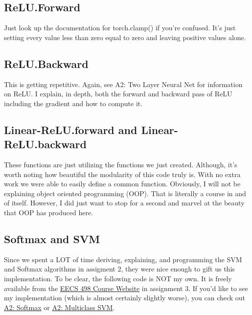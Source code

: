 \documentclass[12pt]{article}
\begin{document}
\subsection{ReLU.Forward}
Just look up the documentation for torch.clamp() if you're confused. It's just setting
every value less than zero equal to zero and leaving positive values alone. 

\subsection{ReLU.Backward}
This is getting repetitive. Again, see A2: Two Layer Neural Net for information on ReLU. 
I explain, in depth, both the forward and backward pass of ReLU including the gradient 
and how to compute it. 

\subsection{Linear-ReLU.forward and Linear-ReLU.backward}
These functions are just utilizing the functions we just created. Although, it's worth 
noting how beautiful the modularity of this code truly is. With no extra work we were 
able to easily define a common function. Obviously, I will not be explaining object oriented 
programming (OOP). That is literally a course in and of itself. However, I did just want to 
stop for a second and marvel at the beauty that OOP has produced here. 

\subsection{Softmax and SVM}
Since we spent a LOT of time deriving, explaining, and programming the SVM and Softmax
algorithms in assigment 2, they were nice enough to gift us this implementation. To be clear, 
the following code is NOT my own. It is freely available from the 
\href{https://web.eecs.umich.edu/~justincj/teaching/eecs498/WI2022/assignment3.html} 
{EECS 498 Course Website} in assignment 3. If you'd like to see my implementation (which is almost
certainly slightly worse), you can check out 
\href{https://github.com/bensmidt/EECS-498-DL-Computer-Vision/blob/main/A2/A2-Softmax.pdf}{A2: Softmax}
or \href{https://github.com/bensmidt/EECS-498-DL-Computer-Vision/blob/main/A2/A2-SVM.pdf}{A2: Multiclass SVM}.
\end{document}
